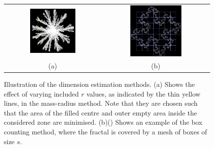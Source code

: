 \documentclass{article}
\theoremstyle{definition}
\theoremstyle{remark}
\begin{document}
\begin{figure}[H]
        \begin{tabular}{cc}
                \centering
                \includegraphics[width=0.5\textwidth]{radius_cutting_img.png} & \includegraphics[width=0.5\textwidth]{Boxcounting.png}\\
                (a) & (b)
        \end{tabular}
        \caption{\label{fig:radiuscutting}Illustration of the dimension estimation methods. (a) Shows the effect of varying included $r$ values, as indicated by the thin yellow lines, in the mass-radius method. Note that they are chosen such that the area of the filled centre and outer empty area inside the considered zone are minimised. (b)(\cite{ImageJ}) Shows an example of the box counting method, where the fractal is covered by a mesh of boxes of size $s$.}
\end{figure}
\end{document}
